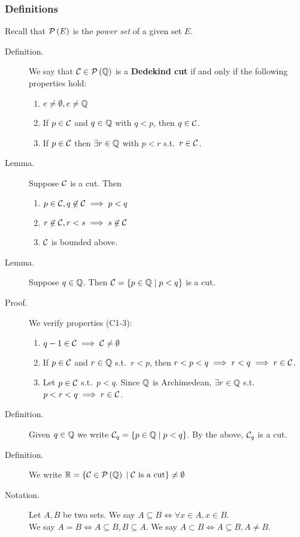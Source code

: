 \documentclass[letterpaper,11pt]{article}
\begin{document}
\subsubsection{Definitions}
Recall that $\mathcal{P}\left(E\right)$ is the \textit{power set} of a given set $E$.
\begin{description}
\item[Definition.] We say that $\mathcal{C}\in\mathcal{P}\left(\mathbb{Q}\right)$ is a \textbf{Dedekind cut}
    if and only if the following properties hold:
    \begin{enumerate}[(C1)]
    \item $e\ne\emptyset, e\ne\mathbb{Q}$
    \item If $p\in\mathcal{C}$ and $q\in\mathbb{Q}$ with $q<p$, then $q\in\mathcal{C}$.
    \item If $p\in\mathcal{C}$ then $\exists r\in\mathbb{Q}$ with $p<r$ s.t.\ $r\in\mathcal{C}$.
    \end{enumerate}

\item[Lemma.] Suppose $\mathcal{C}$ is a cut. Then
  \begin{enumerate}[1)]
  \item $p\in\mathcal{C}, q\not\in\mathcal{C} \implies p<q$
  \item $r\not\in\mathcal{C}, r<s \implies s\not\in\mathcal{C}$
  \item $\mathcal{C}$ is bounded above.
  \end{enumerate}


\item[Lemma.] Suppose $q\in\mathbb{Q}$. Then $\mathcal{C}=\{p\in\mathbb{Q}\;|\;p<q\}$ is a cut.
\item[Proof.] We verify properties (C1-3):
  \begin{enumerate}[(C1)]
  \item $q-1\in\mathcal{C} \implies \mathcal{C}\ne\emptyset$
  \item If $p\in\mathcal{C}$ and $r\in\mathbb{Q}$ s.t.\ $r<p$, then 
      $r<p<q\implies r<q\implies r\in\mathcal{C}$.
  \item Let $p\in\mathcal{C}$ s.t.\ $p<q$. Since $\mathbb{Q}$ is Archimedean,
      $\exists r\in\mathbb{Q}$ s.t.\ $p<r<q\implies r\in\mathcal{C}$.
  \end{enumerate}


\item[Definition.] Given $q\in\mathbb{Q}$ we write $\mathcal{C}_q=\{p\in\mathbb{Q}\;|\;p<q\}$.
    By the above, $\mathcal{C}_q$ is a cut.
\item[Definition.] We write
    $\mathbb{R}=\{\mathcal{C}\in\mathcal{P}\left(\mathbb{Q}\right)\;|\;\mathcal{C}\text{ is a cut}\}\ne\emptyset$

\item[Notation.] Let $A,B$ be two sets.
  We say $A\subseteq B \iff \forall x\in A, x\in B$.\\
  We say $A=B \iff A\subseteq B, B\subseteq A$.
  We say $A\subset B\iff A\subseteq B, A\ne B$.



\end{description}
\end{document}
